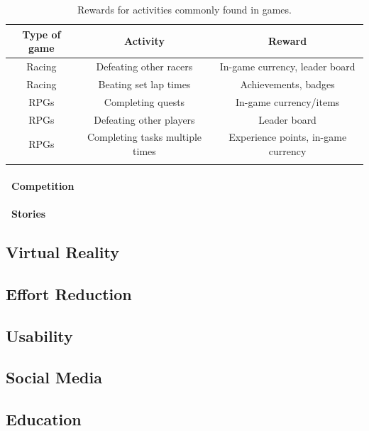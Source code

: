 \documentclass[a4paper,12pt]{article}
\begin{document}
\begin{table}[!ht]
	\begin{tabular}{|c|c|c|}\hline
		\textbf{Type of game} & 	\textbf{Activity} & \textbf{Reward} \\\hline
		Racing 	&	Defeating other racers 	& In-game currency, leader board\\
		Racing	&	Beating set lap times	& Achievements, badges\\
		RPGs 	& Completing quests & In-game currency/items\\
		RPGs 	&	Defeating other players & Leader board\\
		RPGs 	& 	Completing tasks multiple times & Experience points, in-game currency\\
		 & & \\\hline
	\end{tabular}
	\caption{Rewards for activities commonly found in games.}
	\label{table:game-rewards}
\end{table}


\paragraph{\indent~Competition\\}

\paragraph{\indent~Stories\\}

\subsection{Virtual Reality}

\subsection{Effort Reduction}\label{sec:effort-reduction}

\subsection{Usability}

\subsection{Social Media}\label{sec:social-media}

\subsection{Education}
\end{document}
